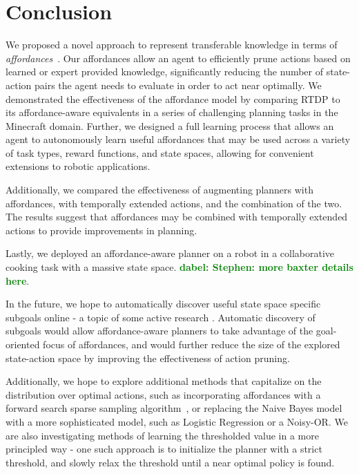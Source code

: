 \documentclass[letterpaper]{article}
\newcommand{\dnote}[1]{\textcolor{Green}{\textbf{dabel:  #1}}}
\begin{document}
\section{Conclusion}
\label{sec:conclusion}
We proposed a novel approach to represent transferable knowledge in terms of
{\em affordances}~\cite{gibson77}. Our affordances allow an agent to efficiently prune actions 
based on learned or expert provided knowledge, significantly reducing the number of state-action
pairs the agent needs to evaluate in order to act near optimally. We demonstrated the 
effectiveness of the affordance model by comparing RTDP to its affordance-aware
equivalents in a series of challenging planning tasks in the Minecraft domain. Further, we designed
a full learning process that allows an agent to autonomously learn useful affordances that may be used
across a variety of task types, reward functions, and state spaces, allowing for convenient extensions 
to robotic applications.

Additionally, we compared the effectiveness of augmenting planners with affordances, with 
temporally extended actions, and the combination of the two. The results suggest that affordances may be combined with 
temporally extended actions to provide improvements in planning.

Lastly, we deployed an affordance-aware planner on a robot in a collaborative cooking task with a massive 
state space. \dnote{Stephen: more baxter details here}.

In the future, we hope to automatically discover useful state space specific subgoals online 
- a topic of some active research \cite{Mcgovern01automaticdiscovery,Simsek:2005:IUS:1102351.1102454}.
Automatic discovery of subgoals would allow affordance-aware planners to take advantage of the goal-oriented
focus of affordances, and would further reduce the size of the explored state-action space by improving the effectiveness of action pruning. 

Additionally, we hope to explore additional methods that capitalize on the distribution over optimal actions,
such as incorporating affordances with a forward search sparse sampling algorithm~\cite{walsh2010integrating},
or replacing the Naive Bayes model with a more sophisticated model, such as Logistic Regression or a Noisy-OR.
We are also investigating methods of learning the thresholded value in a more principled way - one such
approach is to initialize the planner with a strict threshold, and slowly relax the threshold until a near optimal
policy is found.

{\small


}
\end{document}
